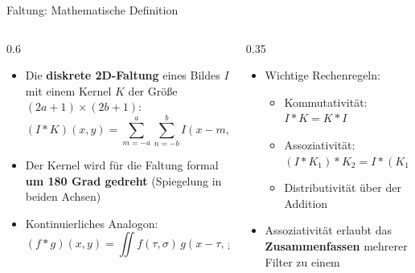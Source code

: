 {%
\begin{frame}{Faltung: Mathematische Definition}
\begin{columns}
\begin{column}{0.6\textwidth}
\begin{itemize}
    \item Die \textbf{diskrete 2D-Faltung} eines Bildes $I$ mit einem Kernel $K$ der Größe $(2a+1) \times (2b+1)$:
    \[
        (I * K)(x, y) = \sum_{m=-a}^{a} \sum_{n=-b}^{b} I(x - m,\, y - n)\, K(m, n)
    \]
    \item Der Kernel wird für die Faltung formal \textbf{um 180 Grad gedreht} (Spiegelung in beiden Achsen)
    \item Kontinuierliches Analogon:
    \[
        (f * g)(x, y) = \iint f(\tau, \sigma)\, g(x - \tau,\, y - \sigma)\, d\tau\, d\sigma
    \]
\end{itemize}
\end{column}
\begin{column}{0.35\textwidth}
\begin{itemize}
    \item Wichtige Rechenregeln:
    \begin{itemize}
        \item Kommutativität: $I * K = K * I$
        \item Assoziativität: $(I * K_1) * K_2 = I * (K_1 * K_2)$
        \item Distributivität über der Addition
    \end{itemize}
    \item Assoziativität erlaubt das \textbf{Zusammenfassen} mehrerer Filter zu einem
\end{itemize}
\end{column}
\end{columns}



\end{frame}}
